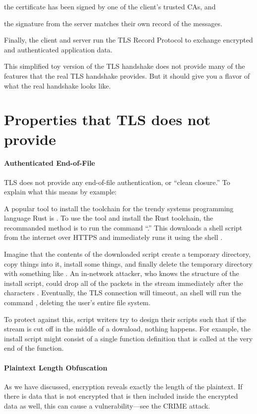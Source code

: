\begin{compactenum}
	\begin{compactitem}
	\item the certificate has been signed by one of the client's trusted CAs, and
	\item the signature from the server matches their own record of the messages.
	\end{compactitem}
\item Finally, the client and server run the TLS Record Protocol to exchange encrypted and authenticated application data.
\end{compactenum}

This simplified toy version of the TLS handshake 
does not provide many of the features that the real TLS handshake
provides. But it should give you a flavor of what the real 
handshake looks like.


\section{Properties that TLS does not provide}

\paragraph{Authenticated End-of-File}
TLS does not provide any end-of-file authentication,
or ``clean closure.''
To explain what this means by example:

A popular tool to install the toolchain for the trendy systems programming language Rust is . To use the tool and install the Rust toolchain, the recommanded method is to run the 
command ``.''
This downloads a shell script from the internet 
over HTTPS and immediately runs it using the shell .

Imagine that the contents of the downloaded script
create a temporary directory, copy things into it,
install some things, and finally delete the
temporary directory with something like .
An in-network attacker, who knows the structure of the 
install script, could drop all of the packets in the stream immediately
after the characters .
Eventually, the TLS connection will timeout, an shell will run
the command , deleting the user's entire file system.

To protect against this, script writers try to
design their scripts such that if the stream is
cut off in the middle of a download, nothing happens.
For example, the install script might consist of a 
single function definition that is called at the very 
end of the function.

\paragraph{Plaintext Length Obfuscation}
As we have discussed, encryption reveals exactly
the length of the plaintext. If there is data that
is not encrypted that is then included inside the
encrypted data as well, this can cause
a vulnerability---see the CRIME attack.
